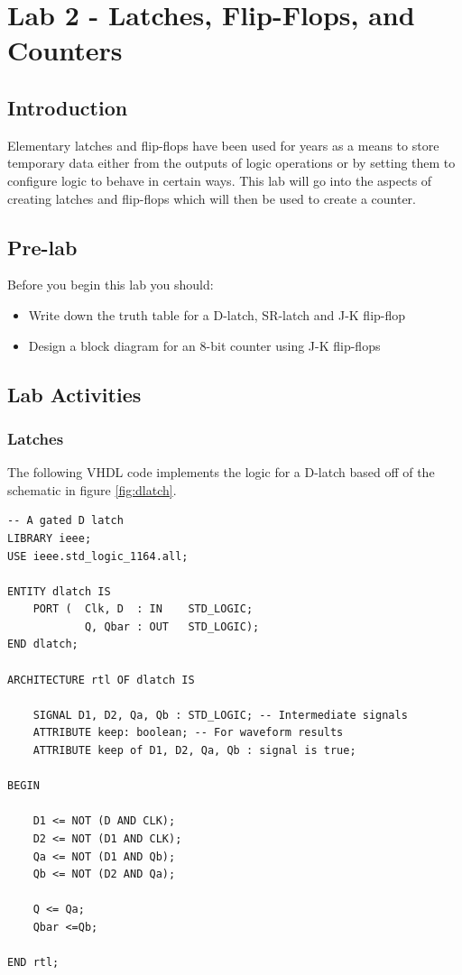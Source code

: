 \section{Lab 2 - Latches, Flip-Flops, and Counters}

\subsection{Introduction}
Elementary latches and flip-flops have been used for years as a means to store temporary data either from the outputs of logic operations or by setting them to configure logic to behave in certain ways. This lab will go into the aspects of creating latches and flip-flops which will then be used to create a counter. 

\subsection{Pre-lab}
Before you begin this lab you should:

\begin{itemize}
	\item Write down the truth table for a D-latch, SR-latch and J-K flip-flop
	\item Design a block diagram for an 8-bit counter using J-K flip-flops
\end{itemize} 

\subsection{Lab Activities}

\subsubsection{Latches}
The following VHDL code implements the logic for a D-latch based off of the schematic in figure \ref{fig:dlatch}. 

\begin{lstlisting}
-- A gated D latch
LIBRARY ieee;
USE ieee.std_logic_1164.all;

ENTITY dlatch IS
	PORT (	Clk, D	: IN	STD_LOGIC;
			Q, Qbar	: OUT	STD_LOGIC);
END dlatch;

ARCHITECTURE rtl OF dlatch IS

	SIGNAL D1, D2, Qa, Qb : STD_LOGIC; -- Intermediate signals
	ATTRIBUTE keep: boolean; -- For waveform results
	ATTRIBUTE keep of D1, D2, Qa, Qb : signal is true;
	
BEGIN
	
	D1 <= NOT (D AND CLK);
	D2 <= NOT (D1 AND CLK);
	Qa <= NOT (D1 AND Qb);
	Qb <= NOT (D2 AND Qa);

	Q <= Qa;
	Qbar <=Qb;
	
END rtl;
\end{lstlisting}



